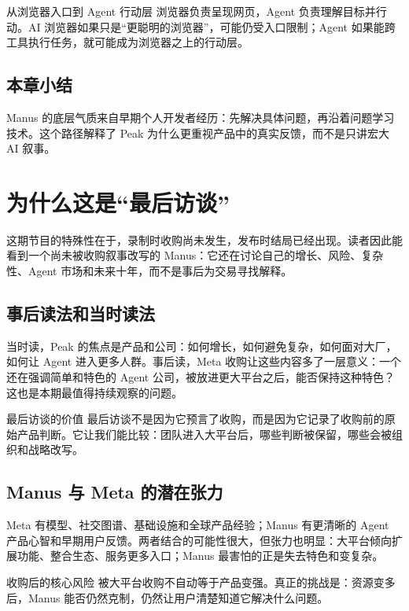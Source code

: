 \documentclass[a4paper]{article}
\begin{document}
\begin{importantbox}{从浏览器入口到 Agent 行动层}
浏览器负责呈现网页，Agent 负责理解目标并行动。AI 浏览器如果只是“更聪明的浏览器”，可能仍受入口限制；Agent 如果能跨工具执行任务，就可能成为浏览器之上的行动层。
\end{importantbox}

\subsection{本章小结}

Manus 的底层气质来自早期个人开发者经历：先解决具体问题，再沿着问题学习技术。这个路径解释了 Peak 为什么更重视产品中的真实反馈，而不是只讲宏大 AI 叙事。

\section{为什么这是“最后访谈”}

这期节目的特殊性在于，录制时收购尚未发生，发布时结局已经出现。读者因此能看到一个尚未被收购叙事改写的 Manus：它还在讨论自己的增长、风险、复杂性、Agent 市场和未来十年，而不是事后为交易寻找解释。

\subsection{事后读法和当时读法}

当时读，Peak 的焦点是产品和公司：如何增长，如何避免复杂，如何面对大厂，如何让 Agent 进入更多人群。事后读，Meta 收购让这些内容多了一层意义：一个还在强调简单和特色的 Agent 公司，被放进更大平台之后，能否保持这种特色？这也是本期最值得持续观察的问题。

\begin{knowledgebox}{最后访谈的价值}
最后访谈不是因为它预言了收购，而是因为它记录了收购前的原始产品判断。它让我们能比较：团队进入大平台后，哪些判断被保留，哪些会被组织和战略改写。
\end{knowledgebox}

\subsection{Manus 与 Meta 的潜在张力}

Meta 有模型、社交图谱、基础设施和全球产品经验；Manus 有更清晰的 Agent 产品心智和早期用户反馈。两者结合的可能性很大，但张力也明显：大平台倾向扩展功能、整合生态、服务更多入口；Manus 最害怕的正是失去特色和变复杂。

\begin{warningbox}{收购后的核心风险}
被大平台收购不自动等于产品变强。真正的挑战是：资源变多后，Manus 能否仍然克制，仍然让用户清楚知道它解决什么问题。
\end{warningbox}
\end{document}
